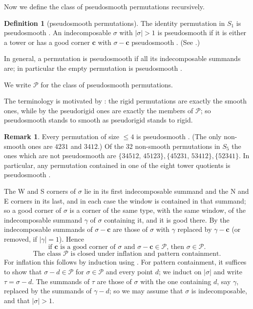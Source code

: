 \documentclass[12pt]{article}
\def\xspace{ }%
\theoremstyle{definition}
\newtheorem{definition}[definition]{Definition}
\newtheorem{remark}[remark]{Remark}
\newcommand{\prig}{pseudorigid\xspace}
\newcommand{\smth}{smooth\xspace}
\newcommand{\psm}{pseudosmooth\xspace}
\newcommand{\good}{good\xspace}
\newcommand{\PA}{\mathcal{P}}          %
\newcommand{\Wcr}{W\xspace}    %
\newcommand{\Ncr}{N\xspace}    %
\newcommand{\Scr}{S\xspace}    %
\newcommand{\Ecr}{E\xspace}    %
\newcommand{\crn}{\mathbf{c}}              %
\begin{document}
Now we define the class of \psm permutations recursively.
\begin{definition}[\psm permutations]\label{def:PA}
The identity permutation in $S_1$ is \psm.
An indecomposable $\sigma$ with $|\sigma| > 1$ is \psm if it is either a tower or has a \good corner $\crn$ with $\sigma - \crn$ \psm.
(See .)

In general, a permutation is \psm if all its indecomposable summands are;
in particular the empty permutation is \psm. 
\end{definition}
We write $\PA$ for the class of \psm permutations.


The terminology is motivated by : the rigid permutations are exactly the \smth
ones, while by  the \prig ones are exactly the members of
$\PA$; so \psm stands to \smth as \prig stands to rigid.

\begin{remark} \label{rem:psm45}
Every permutation of size $\le4$ is \psm. (The only non-smooth ones are $4231$ and $3412$.)
Of the 32 non-smooth permutations in $S_5$ the ones which are not \psm are $\{34512,\,45123\}, \{45231,\,53412\}, \{52341\}$.
In particular, any permutation contained in one of the eight tower quotients is \psm.
\end{remark}


The \Wcr and \Scr corners of $\sigma$ lie in its first indecomposable
summand and the \Ncr and \Ecr corners in its last, and in each case the
window is contained in that summand; so a \good corner of $\sigma$ is a
corner of the same type, with the same window, of the indecomposable
summand $\gamma$ of $\sigma$ containing it, and it is \good there. By
 the indecomposable summands of $\sigma - \crn$ are
those of $\sigma$ with $\gamma$ replaced by $\gamma - \crn$ (or removed, if $|\gamma|=1$). Hence
\begin{equation}\label{eq:goodloc}
\text{if $\crn$ is a \good corner of $\sigma$ and $\sigma-\crn \in \PA$,
then $\sigma \in \PA$.}
\end{equation}
\begin{equation}\label{eq:PAhered}
\text{The class $\PA$ is closed under inflation and pattern containment.}
\end{equation}
For inflation this follows by induction using .
For pattern containment, it suffices to show that $\sigma - d \in \PA$ for $\sigma \in \PA$ and
every point $d$; we induct on $|\sigma|$ and write $\tau = \sigma - d$.
The summands of $\tau$ are those of $\sigma$ with the one containing $d$,
say $\gamma$, replaced by the summands of $\gamma - d$; so we may assume
that $\sigma$ is indecomposable, and that $|\sigma| > 1$.
\end{document}
